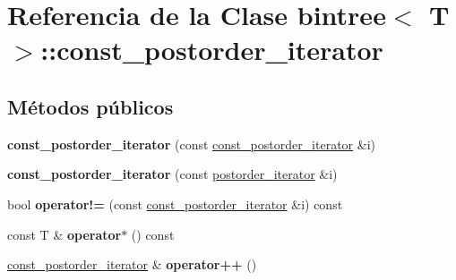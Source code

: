 \hypertarget{classbintree_1_1const__postorder__iterator}{}\section{Referencia de la Clase bintree$<$ T $>$\+:\+:const\+\_\+postorder\+\_\+iterator}
\label{classbintree_1_1const__postorder__iterator}
\subsection*{Métodos públicos}
\begin{DoxyCompactItemize}
\item 
\hypertarget{classbintree_1_1const__postorder__iterator_ac06de2e43882065b26b8137fa66bbb75}{}{\bfseries const\+\_\+postorder\+\_\+iterator} (const \hyperlink{classbintree_1_1const__postorder__iterator}{const\+\_\+postorder\+\_\+iterator} \&i)\label{classbintree_1_1const__postorder__iterator_ac06de2e43882065b26b8137fa66bbb75}

\item 
\hypertarget{classbintree_1_1const__postorder__iterator_a4822203dab2c864becfa74fbec69bd05}{}{\bfseries const\+\_\+postorder\+\_\+iterator} (const \hyperlink{classbintree_1_1postorder__iterator}{postorder\+\_\+iterator} \&i)\label{classbintree_1_1const__postorder__iterator_a4822203dab2c864becfa74fbec69bd05}

\item 
\hypertarget{classbintree_1_1const__postorder__iterator_a3d67bad572cc78bb6a4e4e557fea9011}{}bool {\bfseries operator!=} (const \hyperlink{classbintree_1_1const__postorder__iterator}{const\+\_\+postorder\+\_\+iterator} \&i) const \label{classbintree_1_1const__postorder__iterator_a3d67bad572cc78bb6a4e4e557fea9011}

\item 
\hypertarget{classbintree_1_1const__postorder__iterator_ab4931904dd88d217ab4267654223c4b8}{}const T \& {\bfseries operator$\ast$} () const \label{classbintree_1_1const__postorder__iterator_ab4931904dd88d217ab4267654223c4b8}

\item 
\hypertarget{classbintree_1_1const__postorder__iterator_a314cb317a668b135c4bdb9612e47ff0f}{}\hyperlink{classbintree_1_1const__postorder__iterator}{const\+\_\+postorder\+\_\+iterator} \& {\bfseries operator++} ()\label{classbintree_1_1const__postorder__iterator_a314cb317a668b135c4bdb9612e47ff0f}


\end{DoxyCompactItemize}
